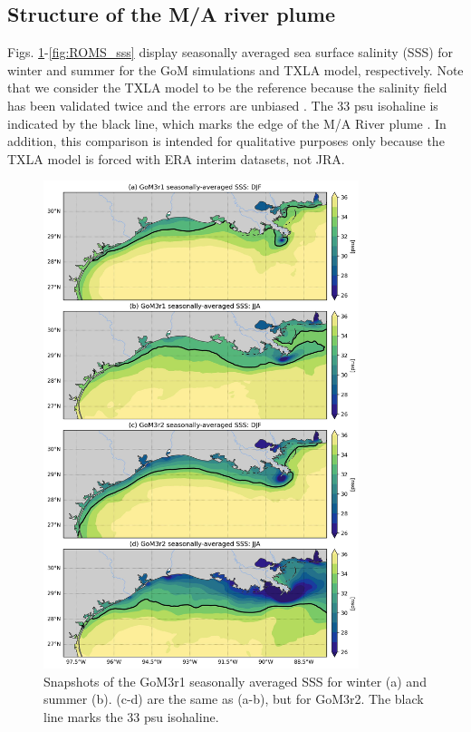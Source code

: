 \subsection{Structure of the M/A river plume}
Figs. \ref{fig:mpaso_sss}-\ref{fig:ROMS_sss} display seasonally averaged sea surface salinity (SSS) for winter and summer for the GoM simulations and TXLA model, respectively. Note that we consider the TXLA model to be the reference because the salinity field has been validated twice and the errors are unbiased \citep{Kobashi_2020, Zhang_2012_numerical}. The 33 psu isohaline is indicated by the black line, which marks the edge of the M/A River plume \citep{hetland2012integrated, thyng2018seasonal}. In addition, this comparison is intended for qualitative purposes only because the TXLA model is forced with ERA interim datasets, not JRA.

\begin{figure}
\centerline{\includegraphics[width=0.82\textwidth]{figures/scgsr/mpaso_sss_mean.jpg}}
    \caption{Snapshots of the GoM3r1 seasonally averaged SSS for winter (a) and summer (b). (c-d) are the same as (a-b), but for GoM3r2. The black line marks the 33 psu isohaline.}
    \label{fig:mpaso_sss}
\end{figure}

